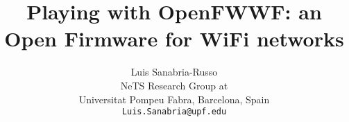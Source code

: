 \documentclass[conference]{IEEEtran}
\begin{document}
 \title{Playing with OpenFWWF: an Open Firmware for WiFi networks}



\author{Luis Sanabria-Russo \\
		NeTS Research Group at\\
		Universitat Pompeu Fabra, Barcelona, Spain\\
		\texttt{Luis.Sanabria@upf.edu}}



\maketitle
\end{document}
